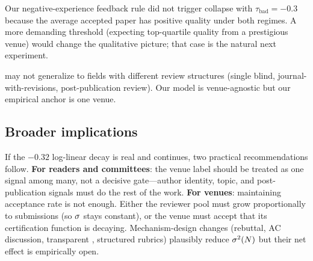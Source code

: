  Our negative-experience feedback rule did not trigger collapse with $\tau_{\text{bad}} = -0.3$ because the average accepted paper has positive quality under both regimes. A more demanding threshold (\eg expecting top-quartile quality from a prestigious venue) would change the qualitative picture; that case is the natural next experiment.

 \iclr may not generalize to fields with different review structures (single blind, journal-with-revisions, post-publication review). Our model is venue-agnostic but our empirical anchor is one venue.

\subsection{Broader implications}

If the $-0.32$ log-linear decay is real and continues, two practical recommendations follow. {\bf For readers and committees}: the venue label should be treated as one signal among many, not a decisive gate---author identity, topic, and post-publication signals must do the rest of the work. {\bf For venues}: maintaining acceptance rate is not enough. Either the reviewer pool must grow proportionally to submissions (so $\sigma$ stays constant), or the venue must accept that its certification function is decaying. Mechanism-design changes (rebuttal, AC discussion, transparent \openreview, structured rubrics) plausibly reduce $\sigma^2(N)$ but their net effect is empirically open.
